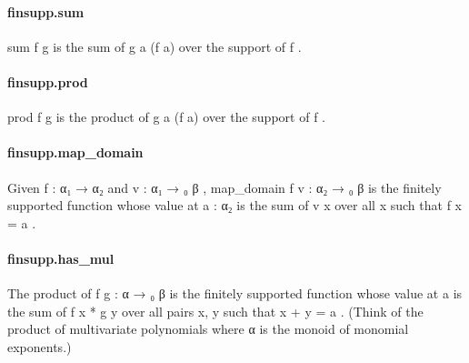 \documentclass{article}
\begin{document}
\paragraph{finsupp.sum}
\par
\colorbox[RGB]{253,246,227}{{{{\color[RGB]{101, 123, 131} sum f g }}}} is the sum of 
\colorbox[RGB]{253,246,227}{{{{\color[RGB]{101, 123, 131} g a (f a) }}}} over the support of 
\colorbox[RGB]{253,246,227}{{{{\color[RGB]{101, 123, 131} f }}}}.
\paragraph{finsupp.prod}
\par
\colorbox[RGB]{253,246,227}{{{{\color[RGB]{101, 123, 131} prod f g }}}} is the product of 
\colorbox[RGB]{253,246,227}{{{{\color[RGB]{101, 123, 131} g a (f a) }}}} over the support of 
\colorbox[RGB]{253,246,227}{{{{\color[RGB]{101, 123, 131} f }}}}.
\paragraph{finsupp.map\_domain}
\par
Given 
\colorbox[RGB]{253,246,227}{{{{\color[RGB]{101, 123, 131} f : α₁  }}}{{{\color[RGB]{133, 153, 0} → }}}{{{\color[RGB]{101, 123, 131}  α₂ }}}} and 
\colorbox[RGB]{253,246,227}{{{{\color[RGB]{101, 123, 131} v : α₁  }}}{{{\color[RGB]{133, 153, 0} → }}}{{{\color[RGB]{101, 123, 131} ₀ β }}}}, 
\colorbox[RGB]{253,246,227}{{{{\color[RGB]{101, 123, 131} map\_domain f v : α₂  }}}{{{\color[RGB]{133, 153, 0} → }}}{{{\color[RGB]{101, 123, 131} ₀ β }}}}is the finitely supported function whose value at 
\colorbox[RGB]{253,246,227}{{{{\color[RGB]{101, 123, 131} a : α₂ }}}} is the sum
of 
\colorbox[RGB]{253,246,227}{{{{\color[RGB]{101, 123, 131} v x }}}} over all 
\colorbox[RGB]{253,246,227}{{{{\color[RGB]{101, 123, 131} x }}}} such that 
\colorbox[RGB]{253,246,227}{{{{\color[RGB]{101, 123, 131} f x  }}}{{{\color[RGB]{181, 137, 0} = }}}{{{\color[RGB]{101, 123, 131}  a }}}}.
\paragraph{finsupp.has\_mul}
\par
The product of 
\colorbox[RGB]{253,246,227}{{{{\color[RGB]{101, 123, 131} f g : α  }}}{{{\color[RGB]{133, 153, 0} → }}}{{{\color[RGB]{101, 123, 131} ₀ β }}}} is the finitely supported function
whose value at 
\colorbox[RGB]{253,246,227}{{{{\color[RGB]{101, 123, 131} a }}}} is the sum of 
\colorbox[RGB]{253,246,227}{{{{\color[RGB]{101, 123, 131} f x  }}}{{{\color[RGB]{181, 137, 0} * }}}{{{\color[RGB]{101, 123, 131}  g y }}}} over all pairs 
\colorbox[RGB]{253,246,227}{{{{\color[RGB]{101, 123, 131} x, y }}}}such that 
\colorbox[RGB]{253,246,227}{{{{\color[RGB]{101, 123, 131} x  }}}{{{\color[RGB]{181, 137, 0} + }}}{{{\color[RGB]{101, 123, 131}  y  }}}{{{\color[RGB]{181, 137, 0} = }}}{{{\color[RGB]{101, 123, 131}  a }}}}. (Think of the product of multivariate
polynomials where 
\colorbox[RGB]{253,246,227}{{{{\color[RGB]{101, 123, 131} α }}}} is the monoid of monomial exponents.)
\end{document}
